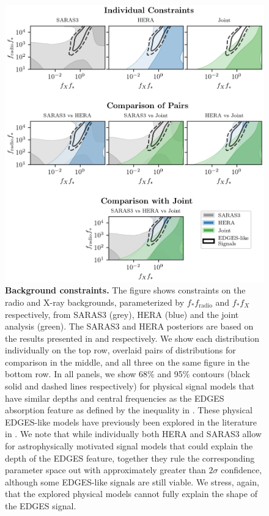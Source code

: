 \begin{figure}
    \centering
    \includegraphics{joint_constraints/figs/xray_vs_radio_background_test.png}
    \caption{\textbf{Background constraints.} The figure shows constraints on the radio and X-ray backgrounds, parameterized by $f_* f_\mathrm{radio}$ and $f_* f_X$ respectively, from SARAS3 (grey), HERA (blue) and the joint analysis (green). The SARAS3 and HERA posteriors are based on the results presented in \cite{Bevins_saras3_2022} and \cite{HERA_2022b} respectively. We show each distribution individually on the top row, overlaid pairs of distributions for comparison in the middle, and all three on the same figure in the bottom row. In all panels, we show 68\% and 95\% contours (black solid and dashed lines respectively) for physical signal models that have similar depths and central frequencies as the EDGES absorption feature as defined by the inequality in \cite{Fialkov2019}. These physical EDGES-like models have previously been explored in the literature in \cite{Fialkov2019, Reis2020}. We note that while individually both HERA and SARAS3 allow for astrophysically motivated signal models that could explain the depth of the EDGES feature, together they rule the corresponding parameter space out with approximately greater than $2\sigma$ confidence, although some EDGES-like signals are still viable. We stress, again, that the explored physical models cannot fully explain the shape of the EDGES signal.}
    \label{fig:background}
\end{figure}


